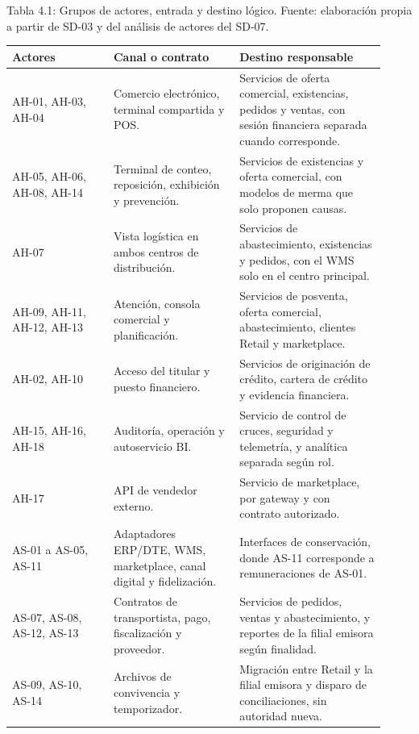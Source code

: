 \documentclass[11pt]{article}
\begin{document}
\par\vspace{0pt plus 10\baselineskip}\vspace{0pt plus -10\baselineskip}

Tabla 4.1: Grupos de actores, entrada y destino lógico. Fuente: elaboración propia a partir de SD-03 y del análisis de actores del SD-07.\par\nopagebreak
\begin{longtable}{@{}p{0.25\linewidth}p{0.31\linewidth}p{0.36\linewidth}@{}}
\toprule Actores & Canal o contrato & Destino responsable \\
\midrule\endhead\bottomrule\endlastfoot
AH-01, AH-03, AH-04 & Comercio electrónico, terminal compartida y POS. & Servicios de oferta comercial, existencias, pedidos y ventas, con sesión financiera separada cuando corresponde. \\
AH-05, AH-06, AH-08, AH-14 & Terminal de conteo, reposición, exhibición y prevención. & Servicios de existencias y oferta comercial, con modelos de merma que solo proponen causas. \\
AH-07 & Vista logística en ambos centros de distribución. & Servicios de abastecimiento, existencias y pedidos, con el WMS solo en el centro principal. \\
AH-09, AH-11, AH-12, AH-13 & Atención, consola comercial y planificación. & Servicios de posventa, oferta comercial, abastecimiento, clientes Retail y marketplace. \\
AH-02, AH-10 & Acceso del titular y puesto financiero. & Servicios de originación de crédito, cartera de crédito y evidencia financiera. \\
AH-15, AH-16, AH-18 & Auditoría, operación y autoservicio BI. & Servicio de control de cruces, seguridad y telemetría, y analítica separada según rol. \\
AH-17 & API de vendedor externo. & Servicio de marketplace, por gateway y con contrato autorizado. \\
AS-01 a AS-05, AS-11 & Adaptadores ERP/DTE, WMS, marketplace, canal digital y fidelización. & Interfaces de conservación, donde AS-11 corresponde a remuneraciones de AS-01. \\
AS-07, AS-08, AS-12, AS-13 & Contratos de transportista, pago, fiscalización y proveedor. & Servicios de pedidos, ventas y abastecimiento, y reportes de la filial emisora según finalidad. \\
AS-09, AS-10, AS-14 & Archivos de convivencia y temporizador. & Migración entre Retail y la filial emisora y disparo de conciliaciones, sin autoridad nueva. \\
\end{longtable}
\end{document}
